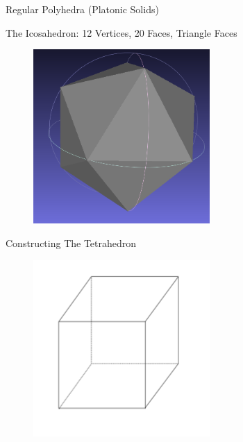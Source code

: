 \documentclass{beamer}
\begin{document}
\begin{frame}{Regular Polyhedra (Platonic Solids)}

The Icosahedron: 12 Vertices, 20 Faces, Triangle Faces

\begin{figure}[t]
    \includegraphics[width=0.6\textwidth]{PlatonicSolids/Icosahedron.png}
\end{figure}

\end{frame}


\begin{frame}{Constructing The Tetrahedron}

\begin{figure}[t]
    \includegraphics[width=0.6\textwidth]{CubeConstruct.pdf}
\end{figure}

\end{frame}
\end{document}
